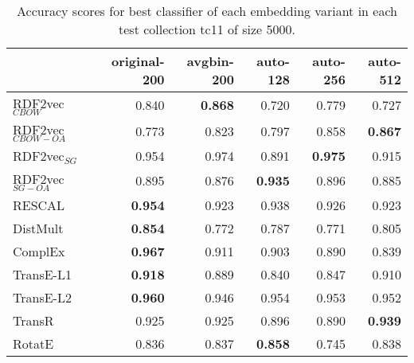 \documentclass[11pt,titlepage,oneside,openany]{book}
\begin{document}
\begin{table}[h!]
\centering
\begin{tabular}{lrrrrr}
\toprule
{} &  original-200 &  avgbin-200 &  auto-128 &  auto-256 &  auto-512 \\
\midrule
RDF2vec$_{CBOW}$     &         0.840  &	\textbf{0.868} &     0.720  &     0.779  &     0.727  \\
RDF2vec$_{CBOW-OA}$  &         0.773  &       0.823  &     0.797  &     0.858  &	\textbf{0.867} \\
RDF2vec$_{SG}$       &         0.954  &       0.974  &     0.891  &	\textbf{0.975} &     0.915  \\
RDF2vec$_{SG-OA}$    &         0.895  &       0.876  &	\textbf{0.935} &     0.896  &     0.885  \\
RESCAL               &	\textbf{0.954} &       0.923  &     0.938  &     0.926  &     0.923  \\
DistMult             &	\textbf{0.854} &       0.772  &     0.787  &     0.771  &     0.805  \\
ComplEx              &	\textbf{0.967} &       0.911  &     0.903  &     0.890  &     0.839  \\
TransE-L1            &	\textbf{0.918} &       0.889  &     0.840  &     0.847  &     0.910  \\
TransE-L2            &	\textbf{0.960} &       0.946  &     0.954  &     0.953  &     0.952  \\
TransR               &         0.925  &       0.925  &     0.896  &     0.890  &	\textbf{0.939} \\
RotatE               &         0.836  &       0.837  &	\textbf{0.858} &     0.745  &     0.838  \\
\bottomrule
\end{tabular}
\caption{Accuracy scores for best classifier of each embedding variant in each test collection tc11 of size 5000.}
\label{tab:dlcc-acc-tc11-5000}
\end{table}
\end{document}
